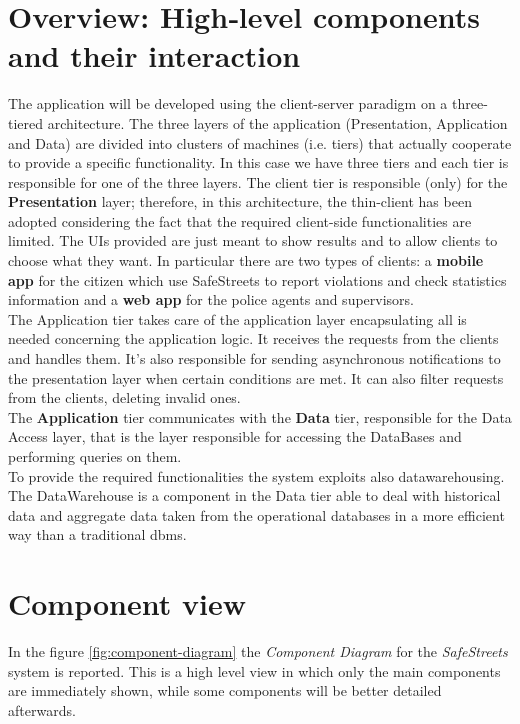 \documentclass[a4paper]{report}
\begin{document}
\section{Overview: High­‐level components and their interaction}
The application will be developed using the client-server paradigm on a three-tiered architecture. The three layers of the application (Presentation, Application and Data) are divided into clusters of machines (i.e. tiers) that actually cooperate to provide a specific functionality. In this case we have three tiers  and each tier is responsible for one of the three layers. The client tier is responsible (only) for the \textbf{Presentation} layer; therefore, in this architecture, the thin-client has been adopted considering the fact that the required client-side functionalities are limited. The UIs provided are just meant to show results and to allow clients to choose what they want. In particular there are two types of clients: a \textbf{mobile app} for the citizen which use SafeStreets to report violations and check statistics information and a \textbf{web app} for the police agents and supervisors. \\
The Application tier takes care of the application layer encapsulating all is needed concerning the application logic. It receives the requests from the clients and handles them. It's also responsible for sending asynchronous notifications to the presentation layer when certain conditions are met. It can also filter requests from the clients, deleting invalid ones.\\
The \textbf{Application} tier communicates with the \textbf{Data} tier, responsible for the Data Access layer, that is the layer responsible for accessing the DataBases and performing queries on them.\\
To provide the required functionalities the system exploits also datawarehousing. The DataWarehouse is a component in the Data tier able to deal with historical data and aggregate data taken from the operational databases in a more efficient way than a traditional dbms.
\section{Component view}
In the figure \ref{fig:component-diagram} the \textit{Component Diagram} for the \textit{SafeStreets} system is reported. This is a high level view in which only the main components are immediately shown, while some components will be better detailed afterwards.
\end{document}
